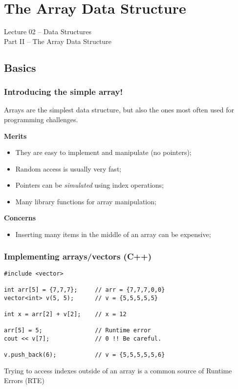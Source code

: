 \section{The Array Data Structure}

\begin{frame}
  \begin{center}
    {\large Lecture 02 -- Data Structures\\Part II -- The Array Data Structure}\\
  \end{center}
\end{frame}

\subsection{Basics}

\begin{frame}
  \frametitle{Introducing the simple array!}

  Arrays are the simplest data structure, but also the ones most often used for programming challenges.

  \bigskip

  {\bf Merits}
  \begin{itemize}
  \item They are easy to implement and manipulate (no pointers);
  \item Random access is usually very fast;
  \item Pointers can be \emph{simulated} using index operations;
  \item Many library functions for array manipulation;
  \end{itemize}

  \bigskip

  {\bf Concerns}
  \begin{itemize}
  \item Inserting many items in the middle of an array can be expensive;
  \end{itemize}
\end{frame}


\begin{frame}[fragile]
  \frametitle{Implementing arrays/vectors (C++)}
  {\small
\begin{verbatim}
#include <vector>

int arr[5] = {7,7,7};     // arr = {7,7,7,0,0}
vector<int> v(5, 5);      // v = {5,5,5,5,5}

int x = arr[2] + v[2];    // x = 12

arr[5] = 5;               // Runtime error
cout << v[7];             // 0 !! Be careful.

v.push_back(6);           // v = {5,5,5,5,5,6}
\end{verbatim}
  }

  \begin{alertblock}{}
    Trying to access indexes outside of an array is a common source of
    Runtime Errors (RTE)
  \end{alertblock}

\end{frame}

